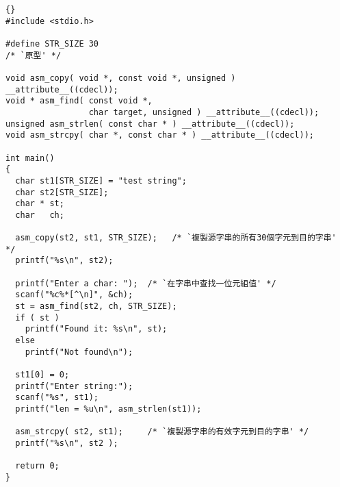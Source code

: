 \lstset{escapeinside=`',language=Pascal,%
}
\begin{lstlisting}{}
#include <stdio.h>

#define STR_SIZE 30
/* `原型' */

void asm_copy( void *, const void *, unsigned ) __attribute__((cdecl));
void * asm_find( const void *,
                 char target, unsigned ) __attribute__((cdecl));
unsigned asm_strlen( const char * ) __attribute__((cdecl));
void asm_strcpy( char *, const char * ) __attribute__((cdecl));

int main()
{
  char st1[STR_SIZE] = "test string";
  char st2[STR_SIZE];
  char * st;
  char   ch;

  asm_copy(st2, st1, STR_SIZE);   /* `複製源字串的所有30個字元到目的字串' */
  printf("%s\n", st2);

  printf("Enter a char: ");  /* `在字串中查找一位元組值' */
  scanf("%c%*[^\n]", &ch);
  st = asm_find(st2, ch, STR_SIZE);
  if ( st )
    printf("Found it: %s\n", st);
  else
    printf("Not found\n");

  st1[0] = 0;
  printf("Enter string:");
  scanf("%s", st1);
  printf("len = %u\n", asm_strlen(st1));

  asm_strcpy( st2, st1);     /* `複製源字串的有效字元到目的字串' */
  printf("%s\n", st2 );

  return 0;
}
\end{lstlisting}

